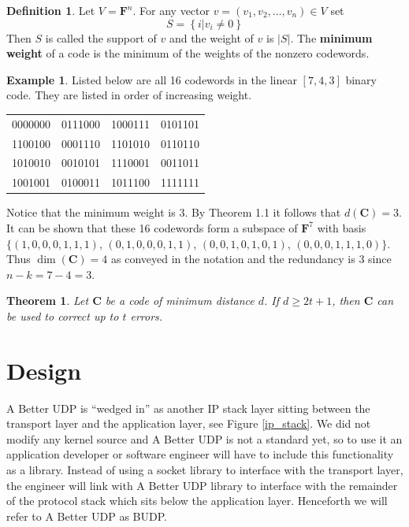 \documentclass[conference]{IEEEtran}
\newtheorem{theorem}[thm]{Theorem}
\theoremstyle{definition}
\newtheorem{definition}[thm]{Definition}
\newtheorem{example}[thm]{Example}
\begin{document}
\begin{definition}
Let $V=\mathbf{F}^n$.  For any vector $v=(v_1,v_2,\ldots,v_n)\in V$
set
$$
S=\left\{i|v_i\neq 0\right\}
$$
Then $S$ is called the support of $v$ and the weight of $v$ is
$\left|S\right|$.  The {\bf minimum weight} of a code is the
minimum of the weights of the nonzero codewords.
\end{definition}


\begin{example}\label{hamming}
Listed below are all 16 codewords in the linear $[7,4,3]$
binary code.  They are listed in order of increasing weight.\\

\begin{center}
 \begin{tabular}{cccc}
  0000000 & 0111000 & 1000111 & 0101101\\
  1100100 & 0001110 & 1101010 & 0110110\\
  1010010 & 0010101 & 1110001 & 0011011\\
  1001001 & 0100011 & 1011100 & 1111111\\
 \end{tabular}
\end{center}

Notice that the minimum weight is 3.  By Theorem 1.1 it
follows that $d(\mathbf{C}) = 3$.  It can be shown
that these 16 codewords form a subspace of $\mathbf{F}^7$
with basis $\{(1,0,0,0,1,1,1)$, $(0,1,0,0,0,1,1)$, 
$(0,0,1,0,1,0,1)$, $(0,0,0,1,1,1,0)\}$. Thus 
$\dim(\mathbf{C})=4$ as conveyed in the notation and the
redundancy is 3 since $n-k=7-4 = 3$.
\end{example}



\begin{theorem}
Let $\mathbf{C}$ be a code of minimum distance $d$.  If
$d\geq2t+1$, then $\mathbf{C}$ can be used to correct up
to $t$ errors.
\end{theorem}

\vspace{6pt}

\section{Design}
A Better UDP is ``wedged in'' as another IP stack
layer sitting between the transport layer and the application
layer, see Figure \ref{ip_stack}.  We did not modify any
kernel source and A Better UDP is not a standard yet, so
to use it an application developer or software engineer
will have to include this functionality as a library.
Instead of using a socket library to interface
with the transport layer, the engineer will link with
A Better UDP library to interface with the remainder of
the protocol stack which sits below the application layer.
Henceforth we will refer to A Better UDP as BUDP.
\end{document}
